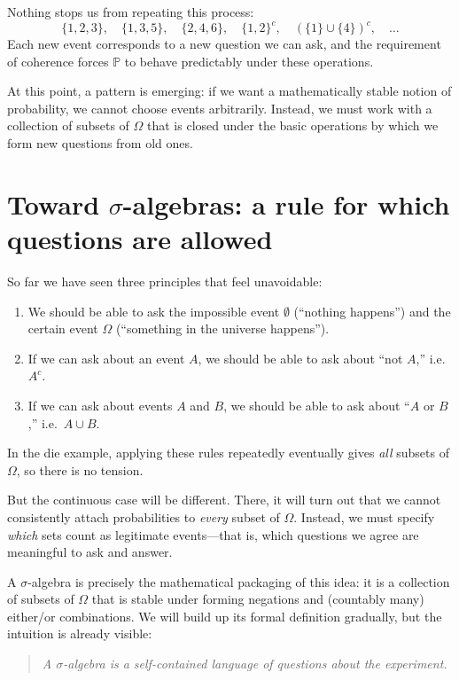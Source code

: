 \documentclass[11pt]{article}
\theoremstyle{remark}
\begin{document}
Nothing stops us from repeating this process:
\[
\{1,2,3\},\quad \{1,3,5\},\quad \{2,4,6\},\quad \{1,2\}^c,\quad
(\{1\}\cup\{4\})^c,\quad \dots
\]
Each new event corresponds to a new question we can ask, and the requirement of coherence
forces \(\mathbb{P}\) to behave predictably under these operations.

At this point, a pattern is emerging:
if we want a mathematically stable notion of probability, we cannot choose events arbitrarily.
Instead, we must work with a collection of subsets of \(\Omega\) that is closed under
the basic operations by which we form new questions from old ones.

\section{Toward \(\sigma\)-algebras: a rule for which questions are allowed}

So far we have seen three principles that feel unavoidable:
\begin{enumerate}
\item We should be able to ask the impossible event \(\emptyset\) (“nothing happens”) and the certain event \(\Omega\) (“something in the universe happens”).
\item If we can ask about an event \(A\), we should be able to ask about “not \(A\),” i.e.\ \(A^c\).
\item If we can ask about events \(A\) and \(B\), we should be able to ask about “\(A\) or \(B\),” i.e.\ \(A\cup B\).
\end{enumerate}

In the die example, applying these rules repeatedly eventually gives \emph{all} subsets of
\(\Omega\), so there is no tension.

But the continuous case will be different.
There, it will turn out that we cannot consistently attach probabilities to \emph{every}
subset of \(\Omega\).
Instead, we must specify \emph{which} sets count as legitimate events---that is, which
questions we agree are meaningful to ask and answer.

A \(\sigma\)-algebra is precisely the mathematical packaging of this idea:
it is a collection of subsets of \(\Omega\) that is stable under forming negations and
(countably many) either/or combinations.
We will build up its formal definition gradually, but the intuition is already visible:
\begin{quote}
\emph{A \(\sigma\)-algebra is a self-contained language of questions about the experiment.}
\end{quote}
\end{document}
